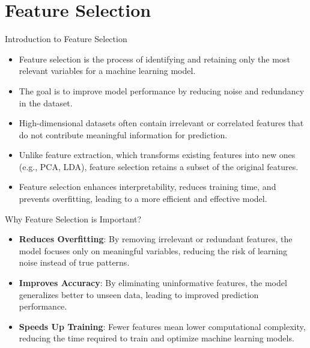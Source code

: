 \documentclass[11pt]{beamer}
\begin{document}
\section{Feature Selection}
%
%
\begin{frame}{Introduction to Feature Selection}
    \begin{itemize}
        \item Feature selection is the process of identifying and retaining only the most relevant variables for a machine learning model.
        \item The goal is to improve model performance by reducing noise and redundancy in the dataset.
        \item High-dimensional datasets often contain irrelevant or correlated features that do not contribute meaningful information for prediction.
        \item Unlike feature extraction, which transforms existing features into new ones (e.g., PCA, LDA), feature selection retains a subset of the original features.
        \item Feature selection enhances interpretability, reduces training time, and prevents overfitting, leading to a more efficient and effective model.
    \end{itemize}
\end{frame}
%
%
\begin{frame}{Why Feature Selection is Important?}
    \begin{itemize}
        \item \textbf{Reduces Overfitting}: By removing irrelevant or redundant features, the model focuses only on meaningful variables, reducing the risk of learning noise instead of true patterns.
        \item \textbf{Improves Accuracy}: By eliminating uninformative features, the model generalizes better to unseen data, leading to improved prediction performance.
        \item \textbf{Speeds Up Training}: Fewer features mean lower computational complexity, reducing the time required to train and optimize machine learning models.
   \end{itemize}     
\end{frame}
%
%
\end{document}
